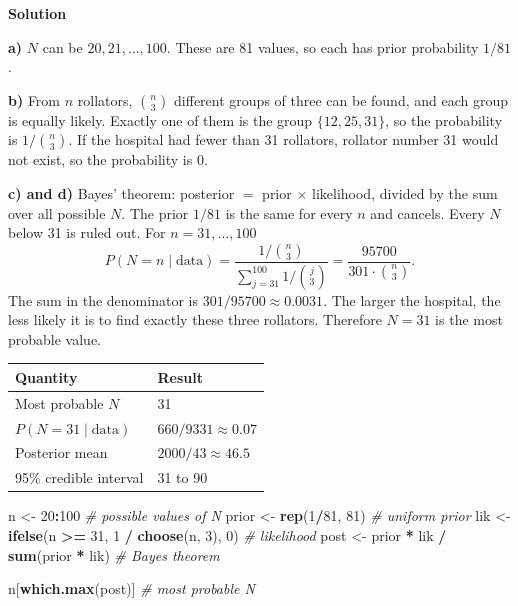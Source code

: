 \documentclass[
]{book}
\newenvironment{Shaded}{\begin{snugshade}}{\end{snugshade}}
\newcommand{\CommentTok}[1]{\textcolor[rgb]{0.56,0.35,0.01}{\textit{#1}}}
\newcommand{\DecValTok}[1]{\textcolor[rgb]{0.00,0.00,0.81}{#1}}
\newcommand{\FunctionTok}[1]{\textcolor[rgb]{0.13,0.29,0.53}{\textbf{#1}}}
\newcommand{\NormalTok}[1]{#1}
\newcommand{\OtherTok}[1]{\textcolor[rgb]{0.56,0.35,0.01}{#1}}
\newcommand{\SpecialCharTok}[1]{\textcolor[rgb]{0.81,0.36,0.00}{\textbf{#1}}}
\begin{document}
\textbf{Solution}

\textbf{a)} \(N\) can be \(20, 21, \dots, 100\). These are 81 values, so each has prior probability \(1/81\).

\textbf{b)} From \(n\) rollators, \(\binom{n}{3}\) different groups of three can be found, and each group is equally likely.
Exactly one of them is the group \(\{12, 25, 31\}\), so the probability is \(1/\binom{n}{3}\).
If the hospital had fewer than 31 rollators, rollator number 31 would not exist, so the probability is 0.

\textbf{c) and d)} Bayes' theorem: posterior \(=\) prior \(\times\) likelihood, divided by the sum over all possible \(N\).
The prior \(1/81\) is the same for every \(n\) and cancels. Every \(N\) below 31 is ruled out. For \(n = 31, \dots, 100\)
\[P(N = n \mid \text{data}) = \frac{1/\binom{n}{3}}{\sum_{j=31}^{100} 1/\binom{j}{3}} = \frac{95700}{301 \cdot \binom{n}{3}}.\]
The sum in the denominator is \(301/95700 \approx 0.0031\). The larger the hospital, the less likely it is to find exactly these three rollators.
Therefore \(N = 31\) is the most probable value.

{\def\LTcaptype{none} %
\begin{longtable}[]{@{}ll@{}}
\toprule\noalign{}
Quantity & Result \\
\midrule\noalign{}
\endhead
\bottomrule\noalign{}
\endlastfoot
Most probable \(N\) & 31 \\
\(P(N = 31 \mid \text{data})\) & \(660/9331 \approx 0.07\) \\
Posterior mean & \(2000/43 \approx 46.5\) \\
95\% credible interval & 31 to 90 \\
\end{longtable}
}

\begin{Shaded}
\begin{Highlighting}[]
\NormalTok{n     }\OtherTok{\textless{}{-}} \DecValTok{20}\SpecialCharTok{:}\DecValTok{100}                                  \CommentTok{\# possible values of N}
\NormalTok{prior }\OtherTok{\textless{}{-}} \FunctionTok{rep}\NormalTok{(}\DecValTok{1}\SpecialCharTok{/}\DecValTok{81}\NormalTok{, }\DecValTok{81}\NormalTok{)                           }\CommentTok{\# uniform prior}
\NormalTok{lik   }\OtherTok{\textless{}{-}} \FunctionTok{ifelse}\NormalTok{(n }\SpecialCharTok{\textgreater{}=} \DecValTok{31}\NormalTok{, }\DecValTok{1} \SpecialCharTok{/} \FunctionTok{choose}\NormalTok{(n, }\DecValTok{3}\NormalTok{), }\DecValTok{0}\NormalTok{)    }\CommentTok{\# likelihood}
\NormalTok{post  }\OtherTok{\textless{}{-}}\NormalTok{ prior }\SpecialCharTok{*}\NormalTok{ lik }\SpecialCharTok{/} \FunctionTok{sum}\NormalTok{(prior }\SpecialCharTok{*}\NormalTok{ lik)          }\CommentTok{\# Bayes\textquotesingle{} theorem}

\NormalTok{n[}\FunctionTok{which.max}\NormalTok{(post)]                               }\CommentTok{\# most probable N}
\end{Highlighting}
\end{Shaded}
\end{document}
